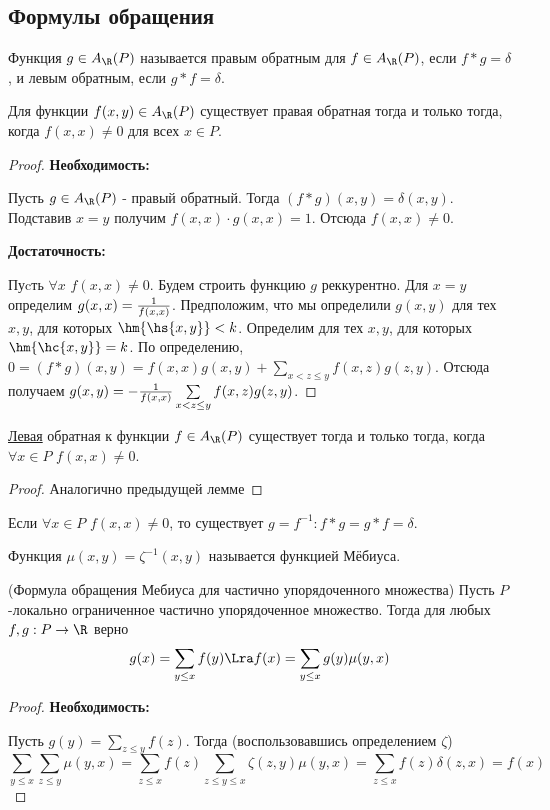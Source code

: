 \documentclass[unicode,10pt]{article}
\begin{document}
\subsection{Формулы обращения}
\begin{df}
  Функция $g\in\arp$ называется правым обратным для $f\in\arp$, если $f\ast g=\delta$,
  и левым обратным, если $g\ast f=\delta$.
\end{df}
\begin{lemma}
  Для функции $f(x,y)\in\arp$ существует правая обратная тогда и только тогда, когда $f(x,x) \neq 0$ для всех $x\in P$.
\end{lemma}
\begin{proof}
  {\bf Необходимость:\par}
  Пусть $g\in\arp$ - правый обратный. Тогда $(f\ast g)(x,y) = \delta(x,y)$. Подставив $x=y$ получим $\displaystyle f(x,x)\cdot g(x,x) = 1$.
  Отсюда $f(x,x)\neq 0$.\par
  {\bf Достаточность:\par}
  Пуcть $\forall x$ $ f(x,x)\neq 0$. Будем строить функцию  $g$ реккурентно.
  Для  $x=y$ определим $g(x,x)=\frac{1}{f(x,x)}$.
  Предположим, что мы определили $g(x,y)$ для тех $x,y$, для которых $\hm{\hs{x,y}}<k$.
  Определим для тех $x,y$, для которых $\hm{\hc{x,y}}=k$. По определению,
  $\displaystyle 0 = (f\ast g)(x,y) = f(x,x)g(x,y)+\sum\limits_{x<z\le y} f(x,z)g(z,y)$.
  Отсюда получаем $g(x,y) = -\frac{1}{f(x,x)}\sum\limits_{x<z\le y}f(x,z)g(z,y)$.
\end{proof}
\begin{lemma}
  \underline{Левая} обратная к функции $f\in\arp$ существует тогда и только тогда, когда
  $\forall x\in P$ $f(x,x)\neq 0$.
\end{lemma}
\begin{proof}
  {Аналогично предыдущей лемме}
\end{proof}
\begin{imp}
  Если $\forall x\in P$ $f(x,x)\neq 0$, то существует $\displaystyle g=f^{-1}: f\ast g=g\ast f=\delta$.
\end{imp}
\begin{df}
  Функция $\mu(x,y)=\zeta^{-1}(x,y)$ называется функцией Мёбиуса.
\end{df}
\begin{theorem}(Формула обращения Мебиуса для частично упорядоченного множества)
  Пусть $P$-локально ограниченное частично упорядоченное множество. Тогда
  для любых $f,g: P\to\R$ верно
  \begin{displaymath}
    g(x)=\sum_{y\le x}f(y) \Lra f(x) = \sum_{y\le x}g(y)\mu(y,x)
  \end{displaymath}
\end{theorem}
\begin{proof}
  {\bf Необходимость:\par}
  Пусть $\displaystyle g(y)=\sum_{z\le y}f(z)$. Тогда (воспользовавшись определением $\zeta$)
  \begin{displaymath}
    \sum_{y\le x}\sum_{z\le y}\mu(y,x) = \sum_{z\le x}f(z)\sum_{z\le y\le x}\zeta(z,y)\mu(y,x) =
    \sum_{z\le x}f(z)\delta(z,x) = f(x)
  \end{displaymath}
\end{proof}
\end{document}
